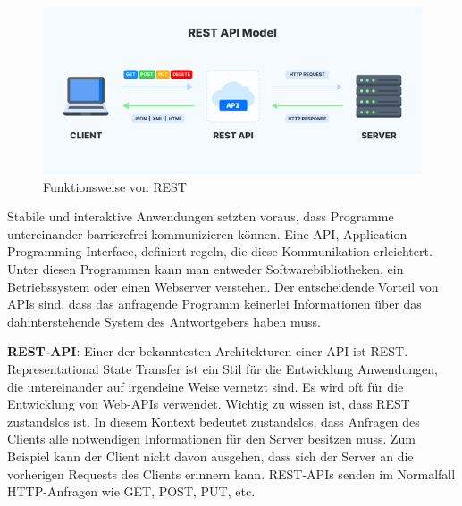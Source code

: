 \begin{figure}[h]
    \centering
    \includegraphics[scale=0.9]{sections/cloud-computing/images/rest-api.png}
    \caption{Funktionsweise von REST}
\end{figure}

Stabile und interaktive Anwendungen setzten voraus, dass Programme untereinander barrierefrei kommunizieren können. Eine API, Application Programming Interface, definiert regeln, die diese Kommunikation erleichtert. Unter diesen Programmen kann man entweder Softwarebibliotheken, ein Betriebssystem oder einen Webserver verstehen.
Der entscheidende Vorteil von APIs sind, dass das anfragende Programm keinerlei Informationen über das dahinterstehende System des Antwortgebers haben muss.

\textbf{REST-API}: Einer der bekanntesten Architekturen einer API ist REST. Representational State Transfer ist ein Stil für die Entwicklung Anwendungen, die untereinander auf irgendeine Weise vernetzt sind. Es wird oft für die Entwicklung von Web-APIs verwendet.
Wichtig zu wissen ist, dass REST zustandslos ist. In diesem Kontext bedeutet zustandslos, dass Anfragen des Clients alle notwendigen Informationen für den Server besitzen muss. Zum Beispiel kann der Client nicht davon ausgehen, dass sich der Server an die vorherigen Requests des Clients erinnern kann.
REST-APIs senden im Normalfall HTTP-Anfragen wie GET, POST, PUT, etc.
